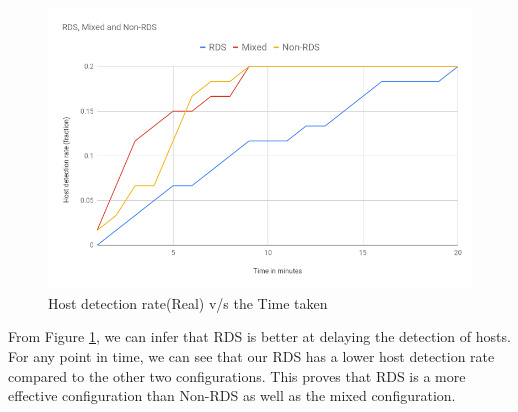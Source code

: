 \FloatBarrier
\begin{figure}[!htbp]
\centering
  \includegraphics[scale=0.7]{Chap5/single.png}
  \caption{Host detection rate(Real) v/s the Time taken}\label{fig:figure21}
\end{figure}

From Figure \ref{fig:figure21}, we can infer that RDS is better at delaying the detection of hosts. For any point in time, we can see that our RDS has a lower host detection rate compared to the other two configurations. This proves that RDS is a more effective configuration than Non-RDS as well as the mixed configuration.


